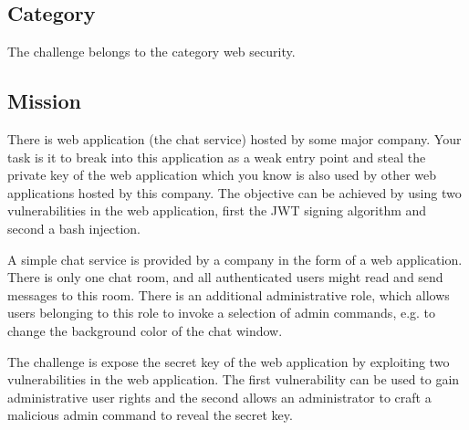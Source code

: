 \documentclass[12pt,a4paper]{article}
\begin{document}
\subsection{Category}

The challenge belongs to the category web security. %

\subsection{Mission}

There is web application (the chat service) hosted by some major company. Your task is it to break into this application as a weak entry point and steal the private key of the web application which you know is also used by other web applications hosted by this company. The objective can be achieved by using two vulnerabilities in the web application, first the JWT signing algorithm and second a bash injection.

A simple chat service is provided by a company in the form of a web application. There is only one chat room, and all authenticated users might read and send messages to this room. There is an additional administrative role, which allows users belonging to this role to invoke a selection of admin commands, e.g. to change the background color of the chat window.

The challenge is expose the secret key of the web application by exploiting two vulnerabilities in the web application. The first vulnerability can be used to gain administrative user rights and the second allows an administrator to craft a malicious admin command to reveal the secret key.


\end{document}
